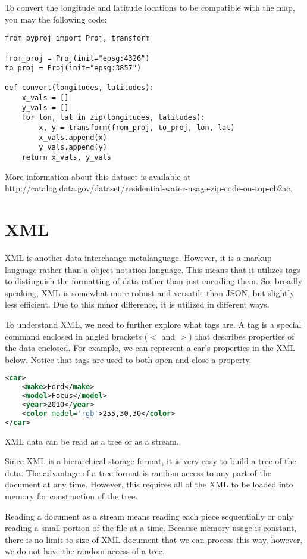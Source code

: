 \begin{problem}
To convert the longitude and latitude locations to be compatible with the map, you may the following code:
\begin{lstlisting}
from pyproj import Proj, transform

from_proj = Proj(init="epsg:4326")
to_proj = Proj(init="epsg:3857")

def convert(longitudes, latitudes):
    x_vals = []
    y_vals = []
    for lon, lat in zip(longitudes, latitudes):
        x, y = transform(from_proj, to_proj, lon, lat)
        x_vals.append(x)
        y_vals.append(y)
    return x_vals, y_vals
\end{lstlisting}

More information about this dataset is available at \url{http://catalog.data.gov/dataset/residential-water-usage-zip-code-on-top-cb2ac}.
\end{problem}

\section*{XML} %

XML is another data interchange metalanguage.
However, it is a markup language rather than a object notation language. This means that it utilizes tags to distinguish the formatting of data rather than just encoding them.
So, broadly speaking, XML is somewhat more robust and versatile than JSON, but slightly less efficient.
Due to this minor difference, it is utilized in different ways.

To understand XML, we need to further explore what tags are.
A tag is a special command enclosed in angled brackets ($<$ and $>$) that describes properties of the data enclosed.
For example, we can represent a car's properties in the XML below. Notice that tags are used to both open and close a property.
\begin{lstlisting}[language=XML]
<car>
    <make>Ford</make>
    <model>Focus</model>
    <year>2010</year>
    <color model='rgb'>255,30,30</color>
</car>
\end{lstlisting}
XML data can be read as a tree or as a stream.

Since XML is a hierarchical storage format, it is very easy to build a tree of the data.
The advantage of a tree format is random access to any part of the document at any time.
However, this requires all of the XML to be loaded into memory for construction of the tree.

Reading a document as a stream means reading each piece sequentially or only reading a small portion of the file at a time.
Because memory usage is constant, there is no limit to size of XML document that we can process this way, however, we do not have the random access of a tree.

